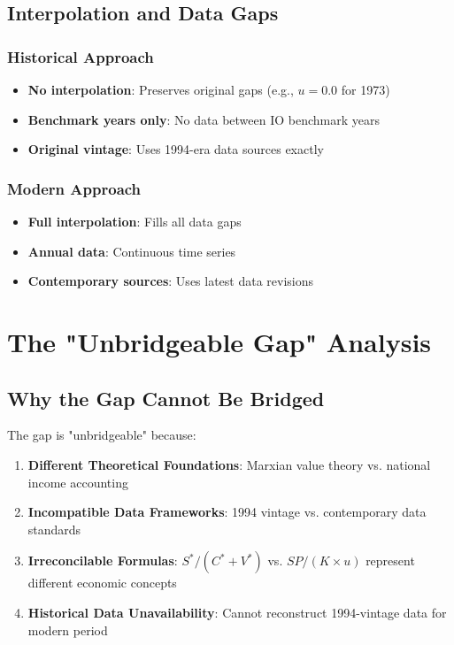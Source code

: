\documentclass[12pt]{article}
\begin{document}
\subsection{Interpolation and Data Gaps}

\subsubsection{Historical Approach}
\begin{itemize}
    \item \textbf{No interpolation}: Preserves original gaps (e.g., $u = 0.0$ for 1973)
    \item \textbf{Benchmark years only}: No data between IO benchmark years
    \item \textbf{Original vintage}: Uses 1994-era data sources exactly
\end{itemize}

\subsubsection{Modern Approach}
\begin{itemize}
    \item \textbf{Full interpolation}: Fills all data gaps
    \item \textbf{Annual data}: Continuous time series
    \item \textbf{Contemporary sources}: Uses latest data revisions
\end{itemize}

\section{The "Unbridgeable Gap" Analysis}

\subsection{Why the Gap Cannot Be Bridged}

\begin{tcolorbox}[colback=orange!5!white,colframe=orange!75!black,title=Fundamental Incompatibility]
The gap is "unbridgeable" because:

\begin{enumerate}
    \item \textbf{Different Theoretical Foundations}: Marxian value theory vs. national income accounting
    \item \textbf{Incompatible Data Frameworks}: 1994 vintage vs. contemporary data standards
    \item \textbf{Irreconcilable Formulas}: $S^*/(C^* + V^*)$ vs. $SP/(K \times u)$ represent different economic concepts
    \item \textbf{Historical Data Unavailability}: Cannot reconstruct 1994-vintage data for modern period
\end{enumerate}
\end{tcolorbox}
\end{document}
